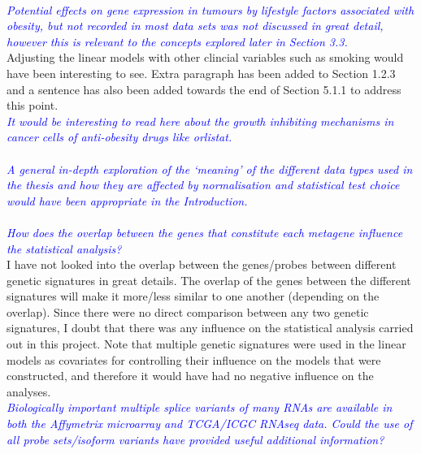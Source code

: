\documentclass[a4paper, 12pt]{article}
\begin{document}
\noindent
\\

\noindent
\textcolor{blue}{
	\textit{Potential effects on gene expression in tumours by lifestyle factors associated with obesity, but not recorded in most data sets was not discussed in great detail, however this is relevant to the concepts explored later in Section 3.3.
	}
}\\

\noindent
Adjusting the linear models with other clincial variables such as smoking would have been interesting to see.
Extra paragraph has been added to Section 1.2.3 and a sentence has also been added towards the end of Section 5.1.1 to address this point.
\\

\noindent
\textcolor{blue}{
	\textit{It would be interesting to read here about the growth inhibiting mechanisms in cancer cells of anti-obesity drugs like orlistat.
	}
}\\

\noindent
\\

\noindent
\textcolor{blue}{
	\textit{A general in-depth exploration of the `meaning' of the different data types used in the thesis and how they are affected by normalisation and statistical test choice would have been appropriate in the Introduction.
	}
}\\

\noindent
\\

\noindent
\textcolor{blue}{
	\textit{How does the overlap between the genes that constitute each metagene influence the statistical analysis?
	}
}\\

\noindent
I have not looked into the overlap between the genes/probes between different genetic signatures in great details.
The overlap of the genes between the different signatures will make it more/less similar to one another (depending on the overlap).
Since there were no direct comparison between any two genetic signatures, I doubt that there was any influence on the statistical analysis carried out in this project.
Note that multiple genetic signatures were used in the linear models as covariates for controlling their influence on the models that were constructed, and therefore it would have had no negative influence on the analyses.
\\

\noindent
\textcolor{blue}{
	\textit{Biologically important multiple splice variants of many RNAs are available in both the Affymetrix microarray and TCGA/ICGC RNAseq data.
	Could the use of all probe sets/isoform variants have provided useful additional information?
	}
}\\
\end{document}
